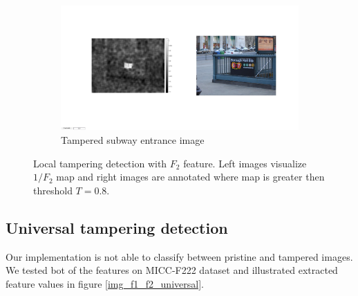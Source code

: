\documentclass{template/acm_proc_article-sp}
\begin{document}
\begin{figure}[H]
\begin{subfigure}{0.46\textwidth}
    \includegraphics[trim=275 300 200 250,clip,width=\linewidth]{report/results/f2_subway.jpg}
    \caption{Tampered subway entrance image}
\end{subfigure}

\caption{Local tampering detection with $F_2$ feature. Left images visualize $1/F_2$ map and right images are annotated where map is greater then threshold $T = 0.8$.}
\label{img_f2_localization}
\end{figure}

\subsection{Universal tampering detection}

Our implementation is not able to classify between pristine and tampered images. We tested bot of the features on MICC-F222 dataset and illustrated extracted feature values in figure \ref{img_f1_f2_universal}.
\end{document}
